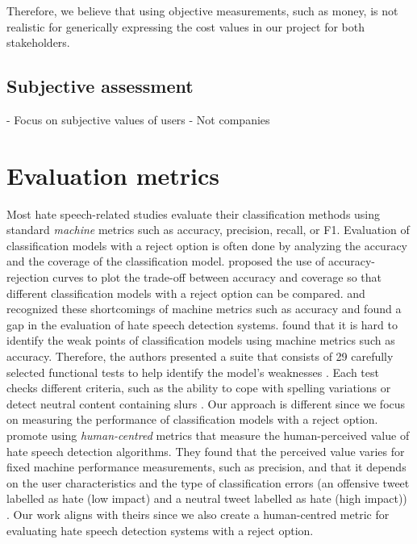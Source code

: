 Therefore, we believe that using objective measurements, such as money, is not realistic for generically expressing the cost values in our project for both stakeholders.

\subsection{Subjective assessment}
- Focus on subjective values of users
- Not companies


\section{Evaluation metrics}
Most hate speech-related studies evaluate their classification methods using standard \textit{machine} metrics such as accuracy, precision, recall, or F1.
% 
Evaluation of classification models with a reject option is often done by analyzing the accuracy and the coverage of the classification model.
%
\citet{nadeem2009reject} proposed the use of accuracy-rejection curves to plot the trade-off between accuracy and coverage so that different classification models with a reject option can be compared.
%
\citet{rottger2020hatecheck} and \citet{olteanu2017limits} recognized these shortcomings of machine metrics such as accuracy and found a gap in the evaluation of hate speech detection systems.
%
\citet{rottger2020hatecheck} found that it is hard to identify the weak points of classification models using machine metrics such as accuracy.
%
Therefore, the authors presented a suite that consists of 29 carefully selected functional tests to help identify the model's weaknesses \citep{rottger2020hatecheck}.
%
Each test checks different criteria, such as the ability to cope with spelling variations or detect neutral content containing slurs \citep{rottger2020hatecheck}.
%
Our approach is different since we focus on measuring the performance of classification models with a reject option.
%
\citet{olteanu2017limits} promote using \textit{human-centred} metrics that measure the human-perceived value of hate speech detection algorithms.
%
They found that the perceived value varies for fixed machine performance measurements, such as precision, and that it depends on the user characteristics and the type of classification errors (an offensive tweet labelled as hate (low impact) and a neutral tweet labelled as hate (high impact)) \citep{olteanu2017limits}.
%
Our work aligns with theirs since we also create a human-centred metric for evaluating hate speech detection systems with a reject option.

